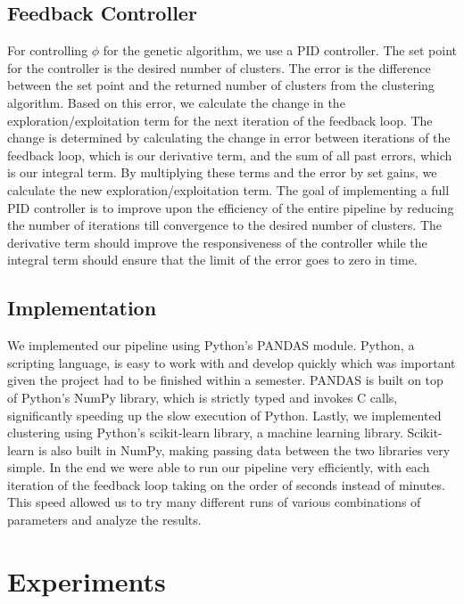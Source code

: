 \documentclass{sig-alternate}
\begin{document}
\subsection{Feedback Controller}
For controlling $\phi$ for the genetic algorithm, we use a PID controller. The set point for the controller is the desired number of clusters. The error is the difference between the set point and the returned number of clusters from the clustering algorithm. Based on this error, we calculate the change in the exploration/exploitation term for the next iteration of the feedback loop. The change is determined by calculating the change in error between iterations of the feedback loop, which is our derivative term, and the sum of all past errors, which is our integral term. By multiplying these terms and the error by set gains, we calculate the new exploration/exploitation term. The goal of implementing a full PID controller is to improve upon the efficiency of the entire pipeline by reducing the number of iterations till convergence to the desired number of clusters. The derivative term should improve the responsiveness of the controller while the integral term should ensure that the limit of the error goes to zero in time.

\subsection{Implementation}
We implemented our pipeline using Python's PANDAS module. Python, a scripting language, is easy to work with and develop quickly which was important given the project had to be finished within a semester. PANDAS is built on top of Python's NumPy library, which is strictly typed and invokes C calls, significantly speeding up the slow execution of Python. Lastly, we implemented clustering using Python's scikit-learn library, a machine learning library. Scikit-learn is also built in NumPy, making passing data between the two libraries very simple. In the end we were able to run our pipeline very efficiently, with each iteration of the feedback loop taking on the order of seconds instead of minutes. This speed allowed us to try many different runs of various combinations of parameters and analyze the results.

\section{Experiments}
\end{document}
